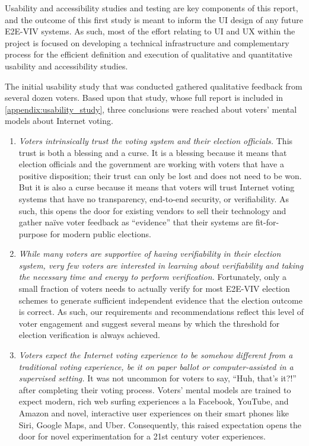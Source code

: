 Usability and accessibility studies and testing are key components of
this report, and the outcome of this first study is meant to inform
the UI design of any future E2E-VIV systems. As such, most of the
effort relating to UI and UX within the project is focused on
developing a technical infrastructure and complementary process for
the efficient definition and execution of qualitative and quantitative
usability and accessibility studies.

The initial usability study that was conducted gathered qualitative
feedback from several dozen voters.  Based upon that study, whose full
report is included in \autoref{appendix:usability_study}, three
conclusions were reached about voters' mental models about Internet
voting.

\begin{enumerate}
\item \emph{Voters intrinsically trust the voting system and their
    election officials.}  This trust is both a blessing and a curse.
  It is a blessing because it means that election officials and the
  government are working with voters that have a positive disposition; 
  their trust can only be lost and does not need to be won. But it is
  also a curse because it means that voters will trust Internet voting
  systems that have no transparency, end-to-end security, or
  verifiability. As such, this opens the door for existing vendors to
  sell their technology and gather na\"ive voter feedback as
  ``evidence'' that their systems are fit-for-purpose for modern
  public elections.
\item \emph{While many voters are supportive of having verifiability
    in their election system, very few voters are interested in
    learning about verifiability and taking the necessary time and
    energy to perform verification.} Fortunately, only a small fraction
  of voters needs to actually verify for most E2E-VIV election schemes
  to generate sufficient independent evidence that the election outcome
  is correct. As such, our requirements and recommendations reflect
  this level of voter engagement and suggest several means by which
  the threshold for election verification is always achieved.
\item \emph{Voters expect the Internet voting experience to be somehow
    different from a traditional voting experience, be it on paper
    ballot or computer-assisted in a supervised setting.} It was not
  uncommon for voters to say, ``Huh, that's it?!'' after completing
  their voting process. Voters' mental models are trained to expect
  modern, rich web surfing experiences a la Facebook, YouTube, and
  Amazon and novel, interactive user experiences on their smart phones
  like Siri, Google Maps, and Uber. Consequently, this raised
  expectation opens the door for novel experimentation for a 21st
  century voter experiences.
\end{enumerate}

